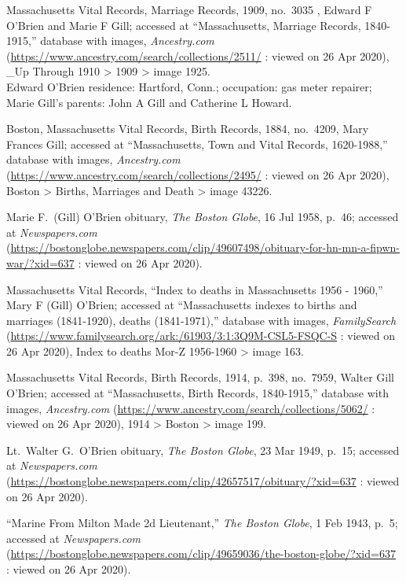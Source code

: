 \begin{thebibliography}{999}
	Massachusetts Vital Records, Marriage Records, 1909, no.\ 3035 , Edward F O'Brien and Marie F Gill; accessed at ``Massachusetts, Marriage Records, 1840-1915,'' database with images, \textit{Ancestry.com} (\url{https://www.ancestry.com/search/collections/2511/} : viewed on 26 Apr 2020), \_Up Through 1910 > 1909 > image 1925.\\
	Edward O'Brien residence: Hartford, Conn.; occupation: gas meter repairer; Marie Gill's parents: John A Gill and Catherine L Howard.
	
	Boston, Massachusetts Vital Records, Birth Records, 1884, no.\ 4209, Mary Frances Gill; accessed at ``Massachusetts, Town and Vital Records, 1620-1988,'' database with images, \textit{Ancestry.com} (\url{https://www.ancestry.com/search/collections/2495/} : viewed on 26 Apr 2020), Boston > Births, Marriages and Death > image 43226.	
	
	Marie F.\ (Gill) O'Brien obituary, \textit{The Boston Globe}, 16 Jul 1958, p.\ 46; accessed at \textit{Newspapers.com} (\url{https://bostonglobe.newspapers.com/clip/49607498/obituary-for-hn-mn-a-fipwn-war/?xid=637} : viewed on 26 Apr 2020).
	
	Massachusetts Vital Records, ``Index to deaths in Massachusetts 1956 - 1960,'' Mary F (Gill) O'Brien; accessed at ``Massachusetts indexes to births and marriages (1841-1920), deaths (1841-1971),'' database with images, \textit{FamilySearch} (\url{https://www.familysearch.org/ark:/61903/3:1:3Q9M-CSL5-FSQC-S} : viewed on 26 Apr 2020), Index to deaths Mor-Z 1956-1960 > image 163.
	
	Massachusetts Vital Records, Birth Records, 1914, p.\ 398, no.\ 7959, Walter Gill O'Brien; accessed at ``Massachusetts, Birth Records, 1840-1915,'' database with images, \textit{Ancestry.com} (\url{https://www.ancestry.com/search/collections/5062/} : viewed on 26 Apr 2020), 1914 > Boston > image 199.
	
	Lt.\ Walter G.\ O'Brien obituary, \textit{The Boston Globe}, 23 Mar 1949, p.\ 15; accessed at \textit{Newspapers.com} (\url{https://bostonglobe.newspapers.com/clip/42657517/obituary/?xid=637} : viewed on 26 Apr 2020).
	
	``Marine From Milton Made 2d Lieutenant,'' \textit{The Boston Globe}, 1 Feb 1943, p.\ 5; accessed at \textit{Newspapers.com} (\url{https://bostonglobe.newspapers.com/clip/49659036/the-boston-globe/?xid=637} : viewed on 26 Apr 2020).
	

\end{thebibliography}
